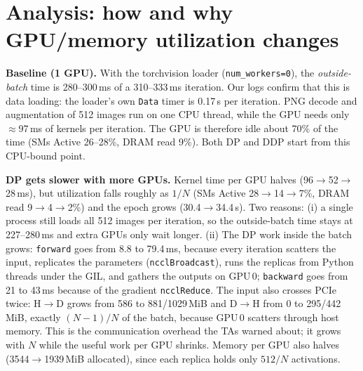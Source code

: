 \documentclass[11pt,a4paper]{article}
\begin{document}
\begin{table}[h]
\centering\small
\caption{Our Vast.ai runs (nvidia-smi sampled every 200\,ms inside the epoch; memory = peak allocated / nvidia-smi max, per GPU).}
\label{tab:ours}

\end{table}

\section{Analysis: how and why GPU/memory utilization changes}

\textbf{Baseline (1 GPU).} With the torchvision loader (\texttt{num\_workers=0}), the \emph{outside-batch} time is 280--300\,ms of a
310--333\,ms iteration. Our logs confirm that this is data loading: the loader's own \texttt{Data} timer is 0.17\,s per iteration. PNG decode and augmentation of
512 images run on one CPU thread, while the GPU needs only $\approx$97\,ms of kernels per iteration. The GPU is therefore idle about 70\% of the time
(SMs Active 26--28\%, DRAM read 9\%). Both DP and DDP start from this CPU-bound point.

\textbf{DP gets slower with more GPUs.} Kernel time per GPU halves (96$\rightarrow$52$\rightarrow$28\,ms), but utilization falls roughly as $1/N$
(SMs Active 28$\rightarrow$14$\rightarrow$7\%, DRAM read 9$\rightarrow$4$\rightarrow$2\%) and the epoch grows (30.4$\rightarrow$34.4\,s). Two reasons:
(i) a single process still loads all 512 images per iteration, so the outside-batch time stays at 227--280\,ms and extra GPUs only wait longer.
(ii) The DP work inside the batch grows: \texttt{forward} goes from 8.8 to 79.4\,ms, because every iteration scatters the input, replicates the
parameters (\texttt{ncclBroadcast}), runs the replicas from Python threads under the GIL, and gathers the outputs on GPU\,0; \texttt{backward} goes from 21 to 43\,ms
because of the gradient \texttt{ncclReduce}. The input also crosses PCIe twice: H$\to$D grows from 586 to 881/1029\,MiB and D$\to$H from 0 to
295/442\,MiB, exactly $(N{-}1)/N$ of the batch, because GPU\,0 scatters through host memory. This is the communication overhead the TAs warned
about; it grows with $N$ while the useful work per GPU shrinks. Memory per GPU also halves (3544$\rightarrow$1939\,MiB allocated), since each replica
holds only $512/N$ activations.
\end{document}
